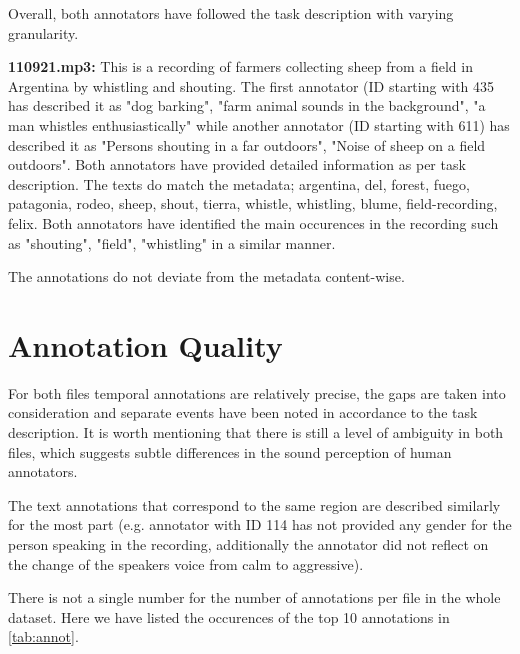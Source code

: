 \documentclass{article}
\begin{document}
Overall, both annotators have followed the task description with varying granularity.

\vspace{3mm}

\textbf{110921.mp3:}
This is a recording of farmers collecting sheep from a field in Argentina by whistling and shouting. The first annotator (ID starting with 435 has described it as "dog barking", "farm animal sounds in the background", "a man whistles enthusiastically" while another annotator (ID starting with 611) has described it as "Persons shouting in a far outdoors", "Noise of sheep on a field outdoors". Both annotators have provided detailed information as per task description. The texts do match the metadata; argentina, del, forest, fuego, patagonia, rodeo, sheep, shout, tierra, whistle, whistling, blume, field-recording, felix. Both annotators have identified the main occurences in the recording such as "shouting", "field", "whistling" in a similar manner. 

The annotations do not deviate from the metadata content-wise.

\section{Annotation Quality}
\label{sec:headings}

For both files temporal annotations are relatively precise, the gaps are taken into consideration and separate events have been noted in accordance to the task description. It is worth mentioning that there is still a level of ambiguity in both files, which suggests subtle differences in the sound perception of human annotators.

The text annotations that correspond to the
same region are described similarly for the most part (e.g. annotator with ID 114 has not provided any gender for the person speaking in the recording, additionally the annotator did not reflect on the change of the speakers voice from calm to aggressive).

There is not a single number for the number of annotations per file in the whole dataset. Here we have listed the occurences of the top 10 annotations in \autoref{tab:annot}.
\end{document}

